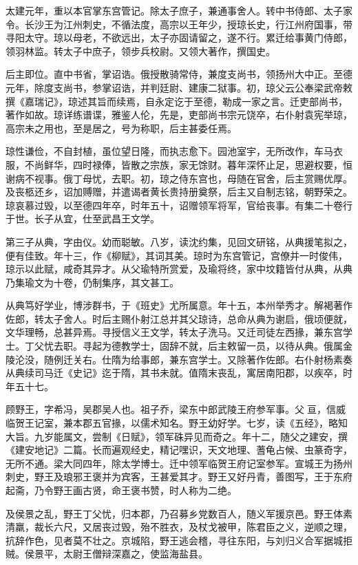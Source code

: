 \documentclass[]{article}
\begin{document}
太建元年，重以本官掌东宫管记。除太子庶子，兼通事舍人。转中书侍郎、太子家令。长沙王为江州刺史，不循法度，高宗以王年少，授琼长史，行江州府国事，带寻阳太守。琼以母老，不欲远出，太子亦固请留之，遂不行。累迁给事黄门侍郎，领羽林监。转太子中庶子，领步兵校尉。又领大著作，撰国史。

后主即位。直中书省，掌诏诰。俄授散骑常侍，兼度支尚书，领扬州大中正。至德元年，除度支尚书，参掌诏诰，并判廷尉、建康二狱事。初，琼父云公奉梁武帝敕撰《嘉瑞记》，琼述其旨而续焉，自永定讫于至德，勒成一家之言。迁吏部尚书，著作如故。琼详练谱谍，雅鉴人伦，先是，吏部尚书宗元饶卒，右仆射袁宪举琼，高宗未之用也，至是居之，号为称职，后主甚委任焉。

琼性谦俭，不自封植，虽位望日隆，而执志愈下。园池室宇，无所改作，车马衣服，不尚鲜华，四时禄俸，皆散之宗族，家无馀财。暮年深怀止足，思避权要，恒谢病不视事。俄丁母忧，去职。初，琼之侍东宫也，母随在官舍，后主赏赐优厚。及丧柩还乡，诏加赙赠，并遣谒者黄长贵持册奠祭，后主又自制志铭，朝野荣之。琼哀慕过毁，以至德四年卒，时年五十，诏赠领军将军，官给丧事。有集二十卷行于世。长子从宜，仕至武昌王文学。

第三子从典，字由仪。幼而聪敏。八岁，读沈约集，见回文研铭，从典援笔拟之，便有佳致。年十三，作《柳赋》，其词其美。琼时为东宫管记，宫僚并一时俊伟，琼示以此赋，咸奇其异才。从父瑜特所赏爱，及瑜将终，家中坟籍皆付从典，从典乃集瑜文为十卷，仍制集序，其文甚工。

从典笃好学业，博涉群书，于《班史》尤所属意。年十五，本州举秀才。解褐著作佐郎，转太子舍人。时后主赐仆射江总并其父琼诗，总命从典为谢启，俄顷便就，文华理畅，总甚异焉。寻授信义王文学，转太子洗马。又迁司徒左西掾，兼东宫学士。丁父忧去职。寻起为德教学士，固辞不就，后主敕留一员，以待从典。俄属金陵沦没，随例迁关右。仕隋为给事郎，兼东宫学士。又除著作佐郎。右仆射杨素奏从典续司马迁《史记》迄于隋，其书未就。值隋末丧乱，寓居南阳郡，以疾卒，时年五十七。

顾野王，字希冯，吴郡吴人也。祖子乔，梁东中郎武陵王府参军事。父亘，信威临贺王记室，兼本郡五官掾，以儒术知名。野王幼好学。七岁，读《五经》，略知大旨。九岁能属文，尝制《日赋》，领军硃异见而奇之。年十二，随父之建安，撰《建安地记》二篇。长而遍观经史，精记嘿识，天文地理、蓍龟占候、虫篆奇字，无所不通。梁大同四年，除太学博士。迁中领军临贺王府记室参军。宣城王为扬州刺史，野王及琅邪王褒并为宾客，王甚爱其才。野王又好丹青，善图写，王于东府起斋，乃令野王画古贤，命王褒书赞，时人称为二绝。

及侯景之乱，野王丁父忧，归本郡，乃召募乡党数百人，随义军援京邑。野王体素清羸，裁长六尺，又居丧过毁，殆不胜衣，及杖戈被甲，陈君臣之义，逆顺之理，抗辞作色，见者莫不壮之。京城陷，野王逃会稽，寻往东阳，与刘归义合军据城拒贼。侯景平，太尉王僧辩深嘉之，使监海盐县。
\end{document}
